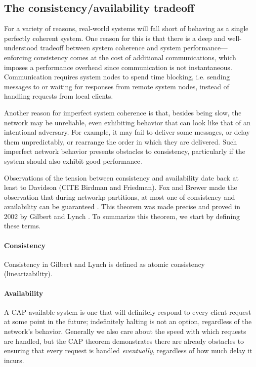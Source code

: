 \subsection{The consistency/availability tradeoff}


For a variety of reasons, real-world systems will fall short of
behaving as a single perfectly coherent system. One reason for this is
that there is a deep and well-understood tradeoff between system
coherence and system performance---enforcing consistency comes at the
cost of additional communications, which imposes a performance
overhead since communication is not instantaneous. Communication
requires system nodes to spend time blocking, i.e. sending messages to
or waiting for responses from remote system nodes, instead of handling
requests from local clients.

Another reason for imperfect system coherence is that, besides being
slow, the network may be unreliable, even exhibiting behavior that can
look like that of an intentional adversary. For example, it may fail
to deliver some messages, or delay them unpredictably, or rearrange
the order in which they are delivered. Such imperfect network behavior
presents obstacles to consistency, particularly if the system should
also exhibit good performance.

Observations of the tension between consistency and availability date
back at least to Davidson \cite{} (CITE Birdman and Friedman). Fox and
Brewer made the observation that during networkp partitions, at most
one of consistency and availability can be guaranteed \cite{}. This
theorem was made precise and proved in 2002 by Gilbert and Lynch
\cite{}. To summarize this theorem, we start by defining these terms.

\paragraph{Consistency}

Consistency in Gilbert and Lynch is defined as atomic consistency
(linearizability).

\paragraph{Availability}

A CAP-available system is one that will definitely respond to every
client request at some point in the future; indefinitely halting is
not an option, regardless of the network's behavior. Generally we also
care about the speed with which requests are handled, but the CAP
theorem demonstrates there are already obstacles to ensuring that
every request is handled \emph{eventually}, regardless of how much delay it
incurs.

